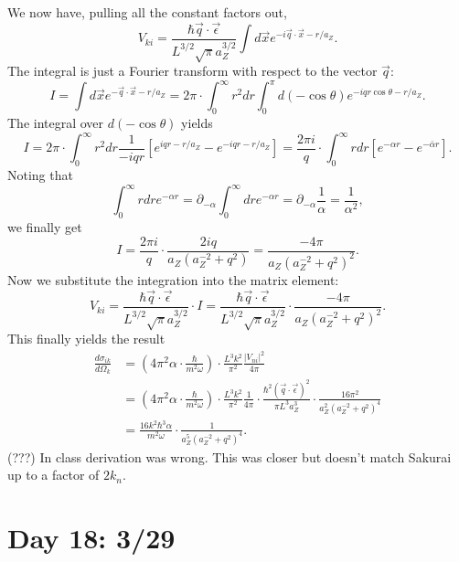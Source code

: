 \documentclass[fontsize=12pt]{scrartcl}
\newcommand{\ptl}{\partial}
\begin{document}
We now have, pulling all the constant factors out, $$V_{ki} = \frac{\hbar\vec{q}\cdot\vec{\epsilon}}{L^{3/2}\sqrt{\pi}a_Z^{3/2}}\int d\vec{x}e^{-i\vec{q}\cdot\vec{x}-r/a_Z}.$$ The integral is just a Fourier transform with respect to the vector $\vec{q}$: $$I=\int d\vec{x}e^{-\vec{q}\cdot\vec{x}-r/a_Z} = 2\pi\cdot\int_0^\infty r^2dr \int_0^\pi d(-\cos\theta)e^{-iqr\cos\theta - r/a_Z}.$$ The integral over $d(-\cos\theta)$ yields $$I=2\pi\cdot\int_0^\infty r^2dr\frac{1}{-iqr}\left[e^{iqr-r/a_Z}-e^{-iqr-r/a_Z}\right]=\frac{2\pi i}{q}\cdot\int_0^\infty r dr \left[e^{-\alpha r}-e^{-\bar{\alpha}r}\right].$$ Noting that $$\int_0^\infty rdr e^{-\alpha r} = \ptl_{-\alpha}\int_0^\infty  dr e^{-\alpha r} = \ptl_{-\alpha}\frac{1}{\alpha}=\frac{1}{\alpha^2},$$ we finally get $$I=\frac{2\pi i}{q}\cdot\frac{2iq}{a_Z(a_Z^{-2}+q^2)} = \frac{-4\pi}{a_Z(a_Z^{-2}+q^2)^2}.$$ Now we substitute the integration into the matrix element: $$V_{ki}= \frac{\hbar\vec{q}\cdot\vec{\epsilon}}{L^{3/2}\sqrt{\pi}a_Z^{3/2}}\cdot I = \frac{\hbar\vec{q}\cdot\vec{\epsilon}}{L^{3/2}\sqrt{\pi}a_Z^{3/2}} \cdot \frac{-4\pi}{a_Z(a_Z^{-2}+q^2)^2}.$$ This finally yields the result \begin{align*} \frac{d\sigma_{ik}}{d\Omega_k} &=\left(4\pi^2\alpha\cdot\frac{\hbar}{m^2\omega}\right)\cdot\frac{L^3k^2}{\pi^2}\frac{|V_{ni}|^2}{4\pi}\\
&= \left(4\pi^2\alpha\cdot\frac{\hbar}{m^2\omega}\right)\cdot\frac{L^3k^2}{\pi^2}\frac{1}{4\pi}\cdot\frac{\hbar^2(\vec{q}\cdot\vec{\epsilon})^2}{\pi L^3 a_Z^3}\cdot\frac{16\pi^2}{a_Z^2(a_Z^{-2}+q^2)^4}\\
&= \frac{16 k^2\hbar^3 \alpha}{m^2\omega}\cdot\frac{1}{a_Z^5(a_Z^{-2}+q^2)^4}.\end{align*} (???) In class derivation was wrong. This was closer but doesn't match Sakurai up to a factor of $2k_n$.




\section{Day 18: 3/29}
\end{document}
